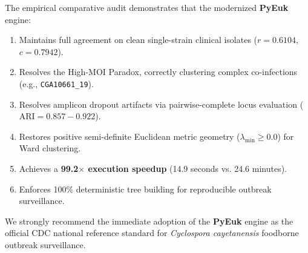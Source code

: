 \documentclass[11pt,a4paper]{article}
\begin{document}
The empirical comparative audit demonstrates that the modernized \textbf{PyEuk} engine:
\begin{enumerate}[leftmargin=*]
    \item Maintains full agreement on clean single-strain clinical isolates ($r = 0.6104$, $c = 0.7942$).
    \item Resolves the High-MOI Paradox, correctly clustering complex co-infections (e.g., \texttt{CGA10661\_19}).
    \item Resolves amplicon dropout artifacts via pairwise-complete locus evaluation ($\text{ARI} = 0.857 - 0.922$).
    \item Restores positive semi-definite Euclidean metric geometry ($\lambda_{\text{min}} \ge 0.0$) for Ward clustering.
    \item Achieves a \textbf{99.2$\times$ execution speedup} (14.9 seconds vs. 24.6 minutes).
    \item Enforces 100\% deterministic tree building for reproducible outbreak surveillance.
\end{enumerate}

We strongly recommend the immediate adoption of the \textbf{PyEuk} engine as the official CDC national reference standard for \textit{Cyclospora cayetanensis} foodborne outbreak surveillance.
\end{document}
